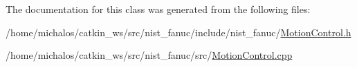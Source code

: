 The documentation for this class was generated from the following files\-:\begin{DoxyCompactItemize}
\item 
/home/michalos/catkin\-\_\-ws/src/nist\-\_\-fanuc/include/nist\-\_\-fanuc/\hyperlink{MotionControl_8h}{Motion\-Control.\-h}\item 
/home/michalos/catkin\-\_\-ws/src/nist\-\_\-fanuc/src/\hyperlink{MotionControl_8cpp}{Motion\-Control.\-cpp}\end{DoxyCompactItemize}
